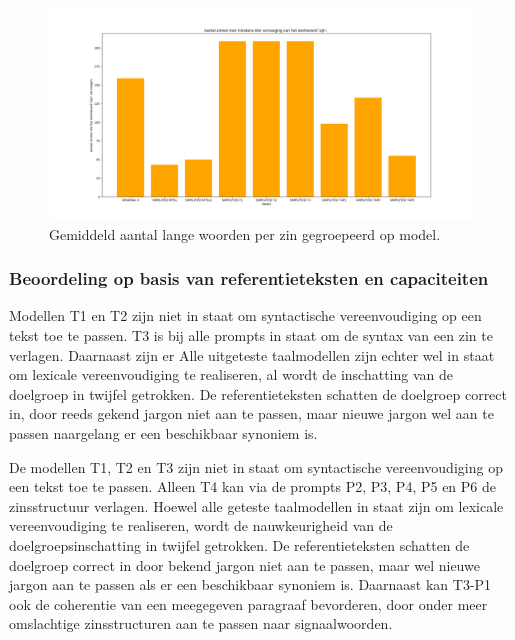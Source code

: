 \begin{figure}
	\includegraphics[width=\linewidth]{img/boxplot-tobe-a2.png}
	\caption{Gemiddeld aantal lange woorden per zin gegroepeerd op model.}
	\label{img:histplot-tobe-a2}
\end{figure}




\subsubsection{Beoordeling op basis van referentieteksten en capaciteiten}

Modellen T1 en T2 zijn niet in staat om syntactische vereenvoudiging op een tekst toe te passen. T3 is bij alle prompts in staat om de syntax van een zin te verlagen. Daarnaast zijn er Alle uitgeteste taalmodellen zijn echter wel in staat om lexicale vereenvoudiging te realiseren, al wordt de inschatting van de doelgroep in twijfel getrokken. De referentieteksten schatten de doelgroep correct in, door reeds gekend jargon niet aan te passen, maar nieuwe jargon wel aan te passen naargelang er een beschikbaar synoniem is.

\medspace

De modellen T1, T2 en T3 zijn niet in staat om syntactische vereenvoudiging op een tekst toe te passen. Alleen T4 kan via de prompts P2, P3, P4, P5 en P6 de zinsstructuur verlagen. Hoewel alle geteste taalmodellen in staat zijn om lexicale vereenvoudiging te realiseren, wordt de nauwkeurigheid van de doelgroepsinschatting in twijfel getrokken. De referentieteksten schatten de doelgroep correct in door bekend jargon niet aan te passen, maar wel nieuwe jargon aan te passen als er een beschikbaar synoniem is.  Daarnaast kan T3-P1 ook de coherentie van een meegegeven paragraaf bevorderen, door onder meer omslachtige zinsstructuren aan te passen naar signaalwoorden.

